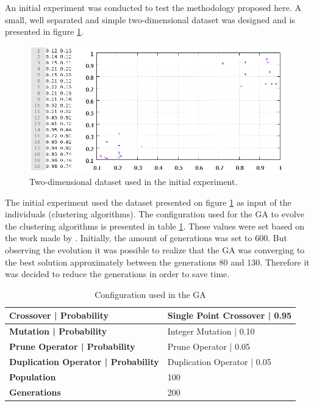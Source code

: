\documentclass[journal]{IEEEtran}
\begin{document}
An initial experiment was conducted to test the methodology proposed here. A small, well separated and simple two-dimensional dataset was designed and is presented in figure \ref{fig:simpleDataset}.

\begin{figure}[ht]
	\centering
	\includegraphics[scale=.9]{figures/simpleDataset.png}
	\caption{Two-dimensional dataset used in the initial experiment.}
	\label{fig:simpleDataset}
\end{figure}

The initial experiment used the dataset presented on figure \ref{fig:simpleDataset} as input of the individuals (clustering algorithms). The configuration used for the GA to evolve the clustering algorithms is presented in table \ref{ga-configuration}. These values were set based on the work made by \cite{lourencco2012evolving}. Initially, the amount of generations was set to 600. But observing the evolution it was possible to realize that the GA was converging to the best solution approximately between the generations 80 and 130. Therefore it was decided to reduce the generations in order to save time.

\begin{table}[]
	\centering
	\caption{Configuration used in the GA}
	\label{ga-configuration}
	\begin{tabular}{|l|l|}
		\hline
		\textbf{Crossover  |  Probability}         & Single Point Crossover | 0.95     \\ \hline
		\textbf{Mutation | Probability}            & Integer Mutation          |  0.10 \\ \hline
		\textbf{Prune Operator | Probability}      & Prune Operator           | 0.05   \\ \hline
		\textbf{Duplication Operator | Probability} & Duplication Operator   | 0.05     \\ \hline
		\textbf{Population}                        & 100                               \\ \hline
		\textbf{Generations}                       & 200                               \\ \hline
	\end{tabular}
\end{table}
\end{document}
